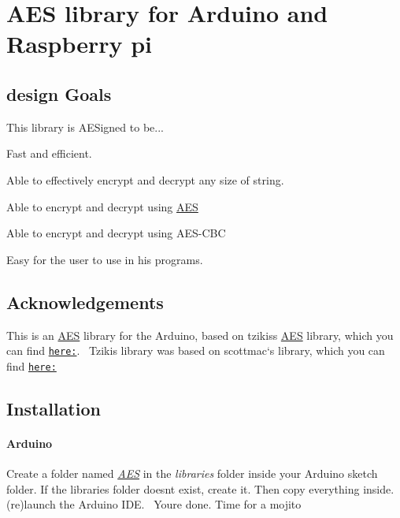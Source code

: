 \hypertarget{group__aeslib}{}\section{A\+ES library for Arduino and Raspberry pi}
\label{group__aeslib}
\hypertarget{group__aeslib_AesGoals}{}\subsection{design Goals}\label{group__aeslib_AesGoals}
This library is A\+E\+Signed to be... \begin{DoxyItemize}
\item Fast and efficient. \item Able to effectively encrypt and decrypt any size of string. \item Able to encrypt and decrypt using \hyperlink{classAES}{A\+ES} \item Able to encrypt and decrypt using A\+E\+S-\/\+C\+BC \item Easy for the user to use in his programs.\end{DoxyItemize}
\hypertarget{group__aeslib_Acknowledgements}{}\subsection{Acknowledgements}\label{group__aeslib_Acknowledgements}
This is an \hyperlink{classAES}{A\+ES} library for the Arduino, based on tzikis\textquotesingle{}s \hyperlink{classAES}{A\+ES} library, which you can find \href{https://github.com/tzikis/arduino}{\tt here\+:}.~\newline
 Tzikis library was based on scottmac`s library, which you can find \href{https://github.com/scottmac/arduino}{\tt here\+:}~\newline
\hypertarget{group__aeslib_Installation}{}\subsection{Installation}\label{group__aeslib_Installation}
\paragraph*{Arduino}

Create a folder named {\itshape \hyperlink{classAES}{A\+ES}} in the {\itshape libraries} folder inside your Arduino sketch folder. If the libraries folder doesn\textquotesingle{}t exist, create it. Then copy everything inside. (re)launch the Arduino I\+DE.~\newline
 You\textquotesingle{}re done. Time for a mojito

